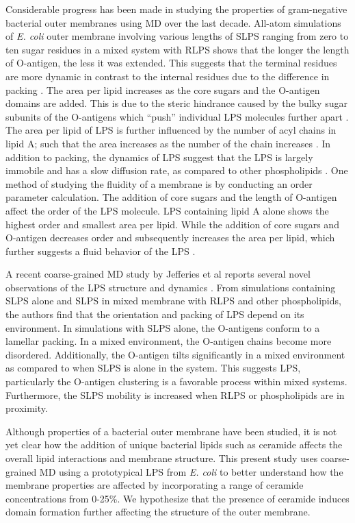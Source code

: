 \documentclass[10pt, letterpaper]{article}
\begin{document}
\par Considerable progress has been made in studying the properties of gram-negative bacterial outer membranes using MD over the last decade. All-atom simulations of \textit{E. coli} outer membrane involving various lengths of SLPS ranging from zero to ten sugar residues in a mixed system with RLPS shows that the longer the length of O-antigen, the less it was extended. This suggests that the terminal residues are more dynamic in contrast to the internal residues due to the difference in packing \cite{wu2013molecular}. The area per lipid increases as the core sugars and the O-antigen domains are added. This is due to the steric hindrance caused by the bulky sugar subunits of the O-antigens which \enquote{push} individual LPS molecules further apart \cite{wu2013molecular}. The area per lipid of LPS is further influenced by the number of acyl chains in lipid A; such that the area increases as the number of the chain increases \cite{kim2016bilayer}. In addition to packing, the dynamics of LPS suggest that the LPS is largely immobile and has a slow diffusion rate, as compared to other phospholipids \cite{patel2016dynamics, lopez2020molecular}. 
One method of studying the fluidity of a membrane is by conducting an order parameter calculation. The addition of core sugars and the length of O-antigen affect the order of the LPS molecule. LPS containing lipid A alone shows the highest order and smallest area per lipid.  While the addition of core sugars and O-antigen decreases order and subsequently increases the area per lipid, which further suggests a fluid behavior of the LPS \cite{wu2013molecular}. 
\newpage
\par A recent coarse-grained MD study by  Jefferies et al reports several novel observations of the LPS structure and dynamics \cite{jefferies2019role}. From simulations containing SLPS alone and SLPS in mixed membrane with RLPS and other phospholipids, the authors find that the orientation and packing of LPS depend on its environment. In simulations with SLPS alone, the O-antigens conform to a lamellar packing. In a mixed environment, the O-antigen chains become more disordered. Additionally, the O-antigen tilts significantly in a mixed environment as compared to when SLPS is alone in the system. This suggests LPS, particularly the O-antigen clustering is a favorable process within mixed systems. Furthermore, the SLPS mobility is increased when RLPS or phospholipids are in proximity. 

\par Although properties of a bacterial outer membrane have been studied, it is not yet clear how the addition of unique bacterial lipids such as ceramide affects the overall lipid interactions and membrane structure. This present study uses coarse-grained MD using a prototypical LPS from \textit{E. coli} to better understand how the membrane properties are affected by incorporating a range of ceramide concentrations from 0-25\%. We hypothesize that the presence of ceramide induces domain formation further affecting the structure of the outer membrane.
\end{document}
